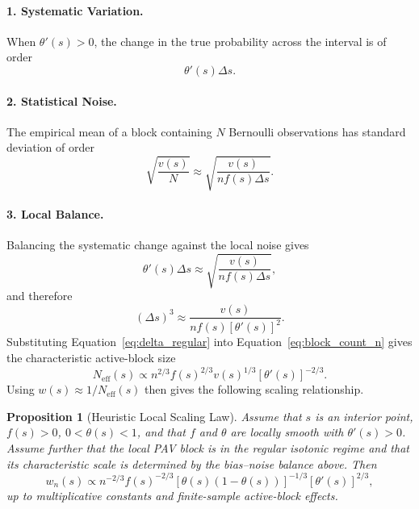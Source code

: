 \documentclass[11pt]{article}
\newtheorem{proposition}{Proposition}
\begin{document}
	\paragraph{1. Systematic Variation.}
	When $\theta'(s)>0$, the change in the true probability across the interval is of order
	\begin{equation}
		\theta'(s)\Delta s.
	\end{equation}
	
	\paragraph{2. Statistical Noise.}
	The empirical mean of a block containing $N$ Bernoulli observations has standard deviation of order
	\begin{equation}
		\sqrt{\frac{v(s)}{N}}
		\approx
		\sqrt{\frac{v(s)}{n f(s)\Delta s}}.
	\end{equation}
	
	\paragraph{3. Local Balance.}
	Balancing the systematic change against the local noise gives
	\begin{equation}
		\theta'(s)\Delta s
		\approx
		\sqrt{\frac{v(s)}{n f(s)\Delta s}},
	\end{equation}
	and therefore
	\begin{equation}
		(\Delta s)^3
		\approx
		\frac{v(s)}{n f(s)[\theta'(s)]^2}.
		\label{eq:delta_regular}
	\end{equation}
	Substituting Equation~\ref{eq:delta_regular} into Equation~\ref{eq:block_count_n} gives the characteristic active-block size
	\begin{equation}
		N_{\mathrm{eff}}(s)
		\propto
		n^{2/3}f(s)^{2/3}v(s)^{1/3}[\theta'(s)]^{-2/3}.
		\label{eq:block_scaling}
	\end{equation}
	Using $w(s)\approx 1/N_{\mathrm{eff}}(s)$ then gives the following scaling relationship.
	
	\begin{proposition}[Heuristic Local Scaling Law]
		Assume that $s$ is an interior point, $f(s)>0$, $0<\theta(s)<1$, and that $f$ and $\theta$ are locally smooth with $\theta'(s)>0$. Assume further that the local PAV block is in the regular isotonic regime and that its characteristic scale is determined by the bias--noise balance above. Then
		\begin{equation}
			w_n(s)
			\propto
			n^{-2/3}f(s)^{-2/3}
			[\theta(s)(1-\theta(s))]^{-1/3}
			[\theta'(s)]^{2/3},
			\label{eq:scaling_law_final}
		\end{equation}
		up to multiplicative constants and finite-sample active-block effects.
	\end{proposition}
	
\end{document}
